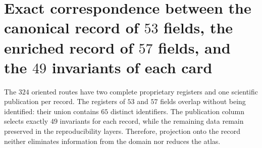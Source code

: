 \section{Exact correspondence between the canonical record of \(53\) fields, the enriched record of \(57\) fields, and the \(49\) invariants of each card}
\label{sec:correspondencia-atlas-53-57-49-sucesor}

The \(324\) oriented routes have two complete proprietary registers and
one scientific publication per record. The registers of \(53\) and \(57\)
fields overlap without being identified: their union contains \(65\) distinct
identifiers. The publication column selects exactly \(49\) invariants
for each record, while the remaining data remain preserved in the
reproducibility layers. Therefore, projection onto the record neither eliminates
information from the domain nor reduces the atlas.

